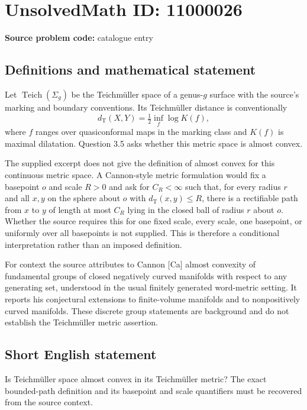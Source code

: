 \documentclass[11pt]{article}
\begin{document}
\section*{UnsolvedMath ID: 11000026}
\textbf{Source problem code:} catalogue entry
\subsection{Definitions and mathematical statement}
Let $\operatorname{Teich}(\Sigma_g)$ be the Teichm\"uller space of a genus-$g$ surface with the source's marking and boundary conventions. Its Teichm\"uller distance is conventionally
\[
 d_{\mathrm T}(X,Y)=\tfrac12\inf_f\log K(f),
\]
where $f$ ranges over quasiconformal maps in the marking class and $K(f)$ is maximal dilatation. Question 3.5 asks whether this metric space is almost convex.

The supplied excerpt does not give the definition of almost convex for this continuous metric space. A Cannon-style metric formulation would fix a basepoint $o$ and scale $R>0$ and ask for $C_R<\infty$ such that, for every radius $r$ and all $x,y$ on the sphere about $o$ with $d_{\mathrm T}(x,y)\leq R$, there is a rectifiable path from $x$ to $y$ of length at most $C_R$ lying in the closed ball of radius $r$ about $o$. Whether the source requires this for one fixed scale, every scale, one basepoint, or uniformly over all basepoints is not supplied. This is therefore a conditional interpretation rather than an imposed definition.

For context the source attributes to Cannon [Ca] almost convexity of fundamental groups of closed negatively curved manifolds with respect to any generating set, understood in the usual finitely generated word-metric setting. It reports his conjectural extensions to finite-volume manifolds and to nonpositively curved manifolds. These discrete group statements are background and do not establish the Teichm\"uller metric assertion.
\subsection{Short English statement}
Is Teichm\"uller space almost convex in its Teichm\"uller metric? The exact bounded-path definition and its basepoint and scale quantifiers must be recovered from the source context.
\end{document}
